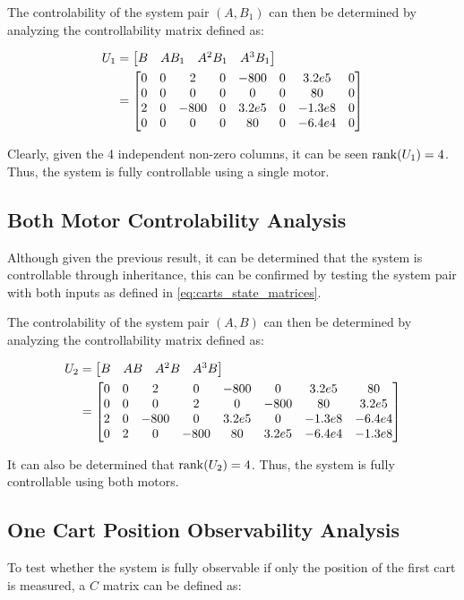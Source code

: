 \documentclass[]{article}
\begin{document}
		The controlability of the system pair $(A, B_1)$ can then be determined by analyzing the controllability matrix defined as:
		
		\begin{equation}
			\begin{aligned}
				U_1 &= \mqty[B		&A B_1		&A^2 B_1	&A^3 B_1]\\
					&= \mqty[0	&0	&2		&0	&-800	&0	&3.2e5	&0\\
							 0	&0	&0		&0	&0		&0	&80		&0\\
							 2	&0	&-800	&0	&3.2e5	&0	&-1.3e8	&0\\
							 0	&0	&0		&0	&80		&0	&-6.4e4	&0]
			\end{aligned}
		\end{equation}
		
		Clearly, given the 4 independent non-zero columns, it can be seen $\rank(U_1) = 4$. Thus, the system is fully controllable using a single motor.
		
	\subsection{Both Motor Controlability Analysis}
		Although given the previous result, it can be determined that the system is controllable through inheritance, this can be confirmed by testing the system pair with both inputs as defined in \eqref{eq:carts_state_matrices}.
		
		The controlability of the system pair $(A, B)$ can then be determined by analyzing the controllability matrix defined as:
		
		\begin{equation}
			\begin{aligned}
				U_2 &= \mqty[B		&AB				&A^2B			&A^3B]\\
					&= \mqty[0	&0	&2		&0		&-800	&0		&3.2e5	&80\\
							 0	&0	&0		&2		&0		&-800	&80		&3.2e5\\
						 	 2	&0	&-800	&0	 	&3.2e5	&0		&-1.3e8	&-6.4e4\\
							 0	&2	&0		&-800	&80		&3.2e5	&-6.4e4	&-1.3e8]
			\end{aligned}
		\end{equation}
		
		It can also be determined that $\rank(U_2) = 4$. Thus, the system is fully controllable using both motors.
	
	\newpage
	\subsection{One Cart Position Observability Analysis}
		To test whether the system is fully observable if only the position of the first cart is measured, a $C$ matrix can be defined as:
		
\end{document}
